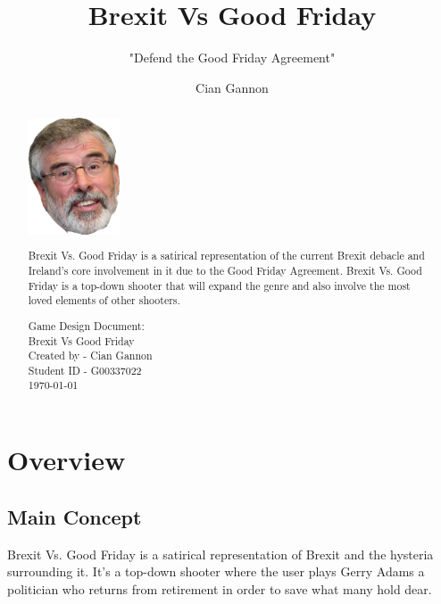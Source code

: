 \documentclass[a4paper]{scrreprt}
\title{Brexit Vs Good Friday}
\subtitle{"Defend the Good Friday Agreement"}
\author{Cian Gannon}
\begin{document}
\maketitle

\begin{abstract}

\centering

\includegraphics[width=2.7cm]{gerrylad}

Brexit Vs. Good Friday is a satirical representation of the current Brexit debacle and Ireland's core involvement in it due to the Good Friday Agreement. 
Brexit Vs. Good Friday is a top-down shooter that will expand the genre and also involve the most loved elements of other shooters.

\begin{flushleft}
\noindent
\null\vfill
Game Design Document: \\
Brexit Vs Good Friday \\
Created by - Cian Gannon \\
Student ID - G00337022 \\
\today
\end{flushleft}

\end{abstract}

\tableofcontents

\chapter{Overview}

\section{Main Concept}
Brexit Vs. Good Friday is a satirical representation of Brexit and the hysteria surrounding it. 
It's a top-down shooter where the user plays Gerry Adams a politician who returns from retirement in order to save what many hold dear.
\end{document}
